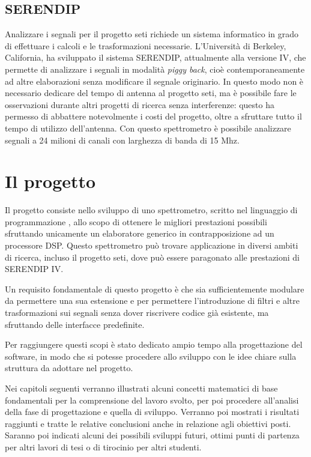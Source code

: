 \subsection*{\ac{SERENDIP}}
Analizzare i segnali per il progetto \ac{seti} richiede un sistema informatico
in grado di effettuare i calcoli e le trasformazioni necessarie. L'Universit\`a
di Berkeley, California, ha sviluppato il sistema \ac{SERENDIP}, attualmente
alla versione IV, che permette di analizzare i segnali in modalit\`a \emph{piggy
back}, cio\`e contemporaneamente ad altre elaborazioni senza modificare il
segnale originario. In questo modo non \`e necessario dedicare del tempo di
antenna al progetto \ac{seti}, ma \`e possibile fare le osservazioni durante
altri progetti di ricerca senza interferenze: questo ha permesso di abbattere
notevolmente i costi del progetto, oltre a sfruttare tutto il tempo di utilizzo
dell'antenna. Con questo spettrometro \`e possibile analizzare segnali a 24
milioni di canali con larghezza di banda di 15 Mhz.

\section*{Il progetto}
Il progetto consiste nello sviluppo di uno spettrometro, scritto nel linguaggio
di programmazione \CC, allo scopo di ottenere le migliori prestazioni possibili
sfruttando unicamente un elaboratore generico in contrapposizione ad un
processore DSP. Questo spettrometro pu\`o trovare applicazione in diversi ambiti
di ricerca, incluso il progetto \ac{seti}, dove pu\`o essere paragonato alle
prestazioni di \ac{SERENDIP} IV.

Un requisito fondamentale di questo progetto \`e che sia sufficientemente
modulare da permettere una sua estensione e per permettere l'introduzione di
filtri e altre trasformazioni sui segnali senza dover riscrivere codice gi\`a
esistente, ma sfruttando delle interfacce predefinite.

Per raggiungere questi scopi \`e stato dedicato ampio tempo alla progettazione
del software, in modo che si potesse procedere allo sviluppo con le idee chiare
sulla struttura da adottare nel progetto.

Nei capitoli seguenti verranno illustrati alcuni concetti matematici di base
fondamentali per la comprensione del lavoro svolto, per poi procedere
all'analisi della fase di progettazione e quella di sviluppo. Verranno poi
mostrati i risultati raggiunti e tratte le relative conclusioni anche in
relazione agli obiettivi posti. Saranno poi indicati alcuni dei possibili
sviluppi futuri, ottimi punti di partenza per altri lavori di tesi o di
tirocinio per altri studenti.
